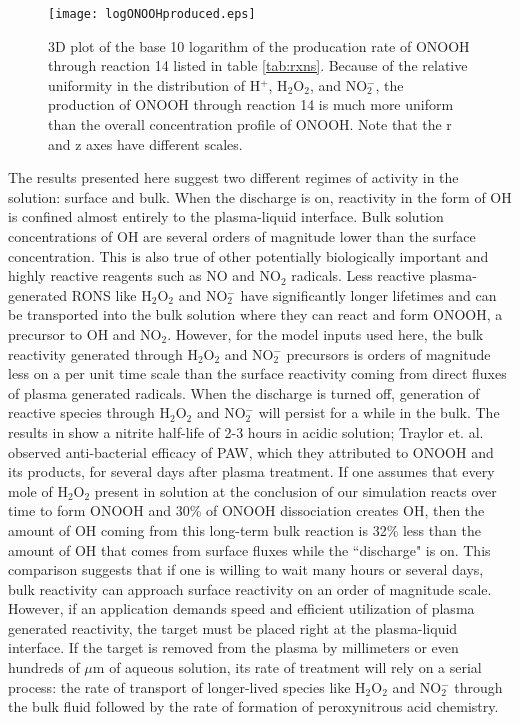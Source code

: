 \documentclass[12pt]{article}
\newcommand{\ONOOHlong}{14}
\begin{document}
\begin{figure}[htb]
    \centering
    \texttt{[image: logONOOHproduced.eps]}
    \caption{3D plot of the base 10 logarithm of the producation rate of ONOOH through reaction \ONOOHlong{} listed in table \ref{tab:rxns}. Because of the relative uniformity in the distribution of H$^+$, H$_2$O$_2$, and NO$_2^-$, the production of ONOOH through reaction \ONOOHlong{} is much more uniform than the overall concentration profile of ONOOH. Note that the r and z axes have different scales.}
    \label{fig:log_ONOOH_prod_rate}
\end{figure}

The results presented here suggest two different regimes of activity in the solution: surface and bulk. When the discharge is on, reactivity in the form of OH is confined almost entirely to the plasma-liquid interface. Bulk solution concentrations of OH are several orders of magnitude lower than the surface concentration. This is also true of other potentially biologically important and highly reactive reagents such as NO and NO$_2$ radicals. Less reactive plasma-generated RONS like H$_2$O$_2$ and NO$_2^-$ have significantly longer lifetimes and can be transported into the bulk solution where they can react and form ONOOH, a precursor to OH and NO$_2$. However, for the model inputs used here, the bulk reactivity generated through H$_2$O$_2$ and NO$_2^-$ precursors is orders of magnitude less on a per unit time scale than the surface reactivity coming from direct fluxes of plasma generated radicals. When the discharge is turned off, generation of reactive species through H$_2$O$_2$ and NO$_2^-$ will persist for a while in the bulk. The results in \cite{Lukes2014b} show a nitrite half-life of 2-3 hours in acidic solution; Traylor et. al. \cite{Traylor2011h} observed anti-bacterial efficacy of PAW, which they attributed to ONOOH and its products, for several days after plasma treatment. If one assumes that every mole of H$_2$O$_2$ present in solution at the conclusion of our simulation reacts over time to form ONOOH and 30\% of ONOOH dissociation creates OH, then the amount of OH coming from this long-term bulk reaction is 32\% less than the amount of OH that comes from surface fluxes while the ``discharge" is on. This comparison suggests that if one is willing to wait many hours or several days, bulk reactivity can approach surface reactivity on an order of magnitude scale. However, if an application demands speed and efficient utilization of plasma generated reactivity, the target must be placed right at the plasma-liquid interface. If the target is removed from the plasma by millimeters or even hundreds of $\mu$m of aqueous solution, its rate of treatment will rely on a serial process: the rate of transport of longer-lived species like H$_2$O$_2$ and NO$_2^-$ through the bulk fluid followed by the rate of formation of peroxynitrous acid chemistry.
\end{document}

